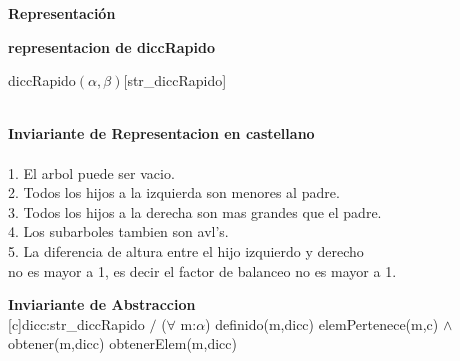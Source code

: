 \documentclass[a4paper,10pt]{article}
\newenvironment{Representacion}{%
  \vspace*{2ex}%
  \noindent\textbf{\Large Representación}%
  \vspace*{2ex}%
}{}
\begin{document}
\begin{Representacion}

\textbf{representacion de diccRapido}

\begin{Estructura}{diccRapido$(\alpha, \beta)$}[str\_diccRapido]

\begin{Tupla}
\end{Tupla}

\begin{Tupla}
\end{Tupla}\\ 

\textbf{Inviariante de Representacion en castellano}\\
\\
1. El arbol puede ser vacio.\\
2. Todos los hijos a la izquierda son menores al padre.\\
3. Todos los hijos a la derecha son mas grandes que el padre.\\
4. Los subarboles tambien son avl's.\\
5. La diferencia de altura entre el hijo izquierdo y derecho\\      no 	es mayor a 1, es decir el factor de balanceo no es mayor a 1.



\vspace{0.20cm}

\textbf{Inviariante de Abstraccion}\\

[c]{dicc:str\_diccRapido $/$ ($\forall$ m:$\alpha$) definido(m,dicc) \igobs elemPertenece(m,c) $\land$ obtener(m,dicc) \igobs obtenerElem(m,dicc)} 


\end{Estructura}

\end{Representacion}
\end{document}
